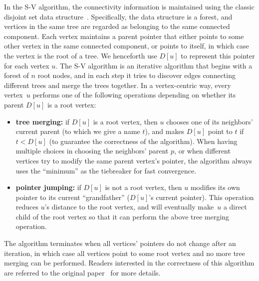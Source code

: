 \documentclass{sokendai_thesis} %
\begin{document}
In the S-V algorithm, the connectivity information is maintained using the classic disjoint set data structure~\cite{disjointset}.
Specifically, the data structure is a forest, and vertices in the same tree are regarded as belonging to the same connected component.
Each vertex maintains a parent pointer that either points to some other vertex in the same connected component, or points to itself, in which case the vertex is the root of a tree.
We henceforth use $D[u]$ to represent this pointer for each vertex $u$.
The S-V algorithm is an iterative algorithm that begins with a forest of $n$ root nodes, and in each step it tries to discover edges connecting different trees and merge the trees together.
In a vertex-centric way, every vertex~$u$ performs one of the following operations depending on whether its parent $D[u]$ is a root vertex:
\begin{itemize}
 \item \textbf{tree merging:}
  if $D[u]$ is a root vertex, then $u$ chooses one of its neighbors' current parent (to which we give a name $t$), and makes $D[u]$ point to $t$ if $t<D[u]$ (to guarantee the correctness of the algorithm).
  When having multiple choices in choosing the neighbors' parent $p$, or when different vertices try to modify the same parent vertex's pointer, the algorithm always uses the ``minimum'' as the tiebreaker for fast convergence.
 \item \textbf{pointer jumping:}
  if $D[u]$ is not a root vertex, then $u$ modifies its own pointer to its current ``grandfather'' ($D[u]$'s current pointer).
  This operation reduces $u$'s distance to the root vertex, and will eventually make~$u$ a direct child of the root vertex so that it can perform the above tree merging operation.
\end{itemize}
The algorithm terminates when all vertices' pointers do not change after an iteration, in which case all vertices point to some root vertex and no more tree merging can be performed.
Readers interested in the correctness of this algorithm are referred to the original paper~\cite{connectivity} for more details.

\end{document}
